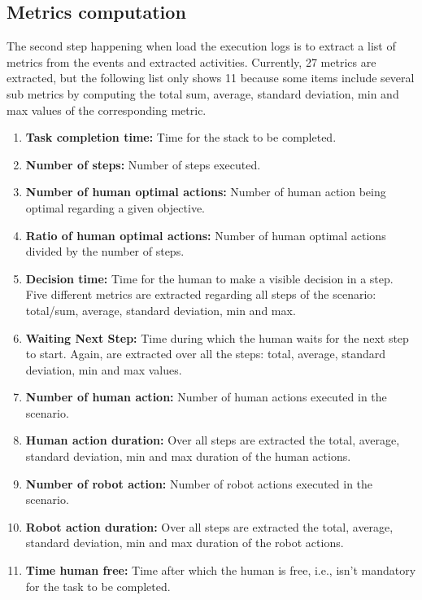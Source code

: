 \subsection{Metrics computation}

The second step happening when load the execution logs is to extract a list of metrics from the events and extracted activities. Currently, 27 metrics are extracted, but the following list only shows 11 because some items include several sub metrics by computing the total sum, average, standard deviation, min and max values of the corresponding metric.

\begin{enumerate}
    \itemsep0em
    \item \textbf{Task completion time:}                 Time for the stack to be completed.
    \item \textbf{Number of steps:}                      Number of steps executed.
    \item \textbf{Number of human optimal actions:}      Number of human action being optimal regarding a given objective.
    \item \textbf{Ratio of human optimal actions:}       Number of human optimal actions divided by the number of steps.
    \item \textbf{Decision time:}                        Time for the human to make a visible decision in a step. Five different metrics are extracted regarding all steps of the scenario: total/sum, average, standard deviation, min and max.
    \item \textbf{Waiting Next Step:}                    Time during which the human waits for the next step to start. Again, are extracted over all the steps: total, average, standard deviation, min and max values.
    \item \textbf{Number of human action:}               Number of human actions executed in the scenario.
    \item \textbf{Human action duration:}                Over all steps are extracted the total, average, standard deviation, min and max duration of the human actions.
    \item \textbf{Number of robot action:}               Number of robot actions executed in the scenario.
    \item \textbf{Robot action duration:}                Over all steps are extracted the total, average, standard deviation, min and max duration of the robot actions.
    \item \textbf{Time human free:}                      Time after which the human is free, i.e., isn't mandatory for the task to be completed.
\end{enumerate}

